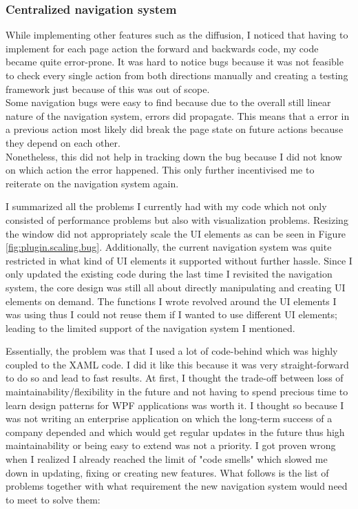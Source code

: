 \subsubsection{Centralized navigation system}

While implementing other features such as the diffusion, I noticed that having to implement for each page action the forward and backwards code, my code became quite error-prone. It was hard to notice bugs because it was not feasible to check every single action from both directions manually and creating a testing framework just because of this was out of scope. \\
Some navigation bugs were easy to find because due to the overall still linear nature of the navigation system, errors did propagate. This means that a error in a previous action most likely did break the page state on future actions because they depend on each other. \\
Nonetheless, this did not help in tracking down the bug because I did not know on which action the error happened. This only further incentivised me to reiterate on the navigation system again.

I summarized all the problems I currently had with my code which not only consisted of performance problems but also with visualization problems. Resizing the window did not appropriately scale the UI elements as can be seen in Figure \ref{fig:plugin.scaling.bug}. Additionally, the current navigation system was quite restricted in what kind of UI elements it supported without further hassle. Since I only updated the existing code during the last time I revisited the navigation system, the core design was still all about directly manipulating and creating UI elements on demand. The functions I wrote revolved around the UI elements I was using thus I could not reuse them if I wanted to use different UI elements; leading to the limited support of the navigation system I mentioned.

Essentially, the problem was that I used a lot of code-behind which was highly coupled to the XAML code. I did it like this because it was very straight-forward to do so and lead to fast results. At first, I thought the trade-off between loss of maintainability/flexibility in the future and not having to spend precious time to learn design patterns for WPF applications was worth it. I thought so because I was not writing an enterprise application on which the long-term success of a company depended and which would get regular updates in the future thus high maintainability or being easy to extend was not a priority. I got proven wrong when I realized I already reached the limit of "code smells" which slowed me down in updating, fixing or creating new features. What follows is the list of problems together with what requirement the new navigation system would need to meet to solve them:

